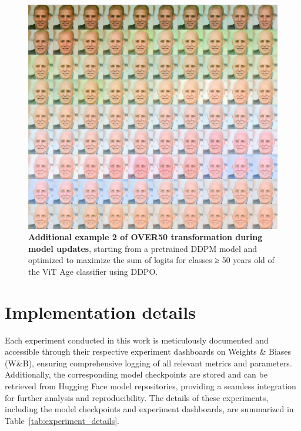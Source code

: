\begin{appendixs}
        \begin{figure}
            \centering
            \includegraphics[scale=2.80]{img/results/over50_46.png}
            \vspace{-0pt}  %
            \captionsetup{width=\textwidth} %
            \caption{\textbf{Additional example 2 of OVER50 transformation during model updates}, starting from a pretrained DDPM model and optimized to maximize the sum of logits for classes ≥ 50 years old of the ViT Age classifier using DDPO.}
            \label{fig:ddpm-to-ddpo-over50-extra2}
        \end{figure}


    \newpage

    \section{Implementation details}\label{appendix:implementation}

    Each experiment conducted in this work is meticulously documented and accessible through their respective experiment dashboards on Weights \& Biases (W\&B), ensuring comprehensive logging of all relevant metrics and parameters. Additionally, the corresponding model checkpoints are stored and can be retrieved from Hugging Face model repositories, providing a seamless integration for further analysis and reproducibility. The details of these experiments, including the model checkpoints and experiment dashboards, are summarized in Table~\ref{tab:experiment_details}.


\end{appendixs}
